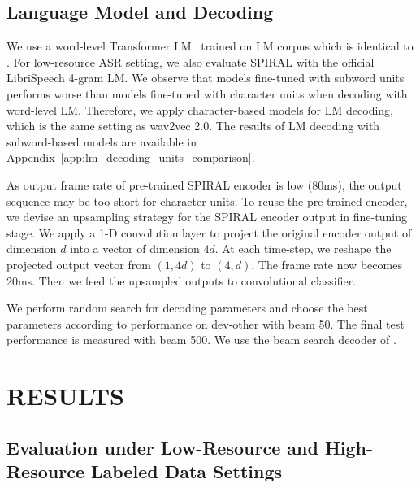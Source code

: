\subsection{Language Model and Decoding}

We use a word-level Transformer LM~\citep{baevski2018adaptive} trained on \libri{} LM corpus which is identical to \citet{synnaeve2020endtoend}. For low-resource ASR setting, we also evaluate SPIRAL \tscbase{} with the official LibriSpeech 4-gram LM.
We observe that models fine-tuned with subword units performs worse than models fine-tuned with character units when decoding with word-level LM.
Therefore, we apply character-based models for LM decoding, which is the same setting as wav2vec 2.0. 
The results of LM decoding with subword-based models are available in Appendix~\ref{app:lm_decoding_units_comparison}.

As output frame rate of pre-trained SPIRAL encoder is low (80ms), the output sequence may be too short for character units. To reuse the pre-trained encoder, we devise an upsampling strategy for the SPIRAL encoder output in fine-tuning stage.
We apply a 1-D convolution layer to project the original encoder output of dimension $d$ into a vector of dimension $4d$. At each time-step, we reshape the projected output vector from $(1, 4d)$ to $(4, d)$. The frame rate now becomes 20ms. 
Then we feed the upsampled outputs to convolutional classifier. 

We perform random search for decoding parameters and choose the best parameters according to performance on dev-other with beam 50.
The final test performance is measured with beam 500.
We use the beam search decoder of \citet{pratap2019w2l}.

\section{RESULTS}
\label{results}

\subsection{Evaluation under Low-Resource and High-Resource Labeled Data Settings}

